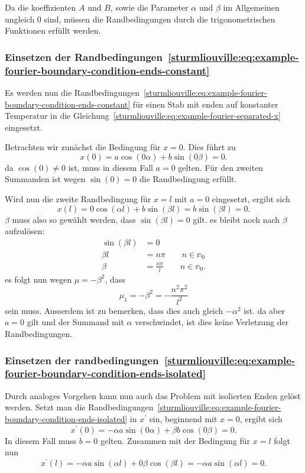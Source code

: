 Da die koeffizienten $A$ und $B$, sowie die Parameter $\alpha$ und $\beta$ im
Allgemeinen ungleich $0$ sind, müssen die Randbedingungen durch die
trigonometrischen Funktionen erfüllt werden.

\subsubsection{Einsetzen der 
Randbedingungen~\eqref{sturmliouville:eq:example-fourier-boundary-condition-ends-constant}}
Es werden nun die 
Randbedingungen~\eqref{sturmliouville:eq:example-fourier-boundary-condition-ends-constant}
für einen Stab mit enden auf konstanter Temperatur in die
Gleichung~\eqref{sturmliouville:eq:example-fourier-separated-x} eingesetzt.

Betrachten wir zunächst die Bedingung für $x = 0$.
Dies führt zu
\[
    x(0)
    =
    a \cos(0 \alpha) + b \sin(0 \beta)
    =
    0.
\]
da $\cos(0) \neq 0$ ist, muss in diesem Fall $a = 0$ gelten.
Für den zweiten Summanden ist wegen $\sin(0) = 0$ die Randbedingung erfüllt.

Wird nun die zweite Randbedingung für $x = l$ mit $a = 0$ eingesetzt, ergibt
sich
\[
    x(l)
    =
    0 \cos(\alpha l) + b \sin(\beta l)
    =
    b \sin(\beta l)
    = 0.
\]
$\beta$ muss also so gewählt werden, dass $\sin(\beta l) = 0$ gilt.
es bleibt noch nach $\beta$ aufzulösen:
\[
\begin{aligned}
    \sin(\beta l) &= 0 \\
    \beta l &= n \pi \qquad n \in \mathbb{n}_0 \\
    \beta &= \frac{n \pi}{l} \qquad n \in \mathbb{n}_0.
\end{aligned}
\]
es folgt nun wegen $\mu = -\beta^{2}$, dass
\[
    \mu_1 = -\beta^{2} = -\frac{n^{2}\pi^{2}}{l^{2}}
\]
sein muss.
Ausserdem ist zu bemerken, dass dies auch gleich $-\alpha^{2}$ ist.
da aber $a = 0$ gilt und der Summand mit $\alpha$ verschwindet, ist dies keine
Verletzung der Randbedingungen.

\subsubsection{Einsetzen der 
randbedingungen~\eqref{sturmliouville:eq:example-fourier-boundary-condition-ends-isolated}}

Durch analoges Vorgehen kann nun auch das Problem mit isolierten Enden gelöst
werden.
Setzt man die 
Randbedingungen~\eqref{sturmliouville:eq:example-fourier-boundary-condition-ends-isolated}
in $x^{\prime}$ ein, beginnend mit $x = 0$, ergibt sich
\[
    x^{\prime}(0)
    =
    -\alpha a \sin(0 \alpha) + \beta b \cos(0 \beta)
    = 0.
\]
In diesem Fall muss $b = 0$ gelten.
Zusammen mit der Bedingung für $x = l$ folgt nun
\[
    x^{\prime}(l)
    =
    - \alpha a \sin(\alpha l) + 0 \beta \cos(\beta l)
    =
    - \alpha a \sin(\alpha l)
    = 0.
\]

